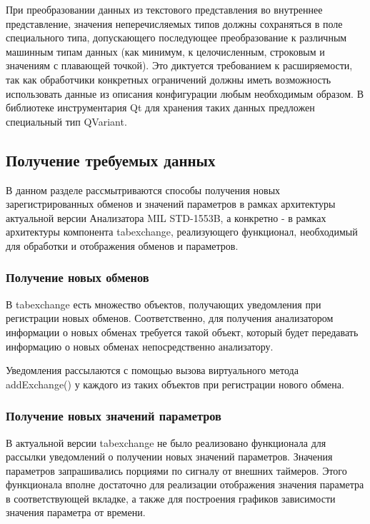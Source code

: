 При преобразовании данных из текстового представления во внутреннее 
представление, значения неперечисляемых типов должны сохраняться в поле 
специального типа, допускающего последующее преобразование к различным машинным 
типам данных (как минимум, к целочисленным, строковым и значениям с плавающей 
точкой). Это диктуется требованием к расширяемости, так как обработчики 
конкретных ограничений должны иметь возможность использовать данные из описания 
конфигурации любым необходимым образом. В библиотеке инструментария Qt для 
хранения таких данных предложен специальный тип QVariant.

\subsection{Получение требуемых данных}

В данном разделе рассмытриваются способы получения новых 
зарегистрированных обменов и значений параметров в рамках архитектуры 
актуальной версии Анализатора MIL STD-1553B, а конкретно - в рамках архитектуры 
компонента tabexchange, реализующего функционал, необходимый для обработки и 
отображения обменов и параметров.

\subsubsection{Получение новых обменов}

В tabexchange есть множество объектов, получающих уведомления при 
регистрации новых обменов. Соответственно, для получения анализатором 
информации о новых обменах требуется такой объект, который будет 
передавать информацию о новых обменах непосредственно анализатору.

Уведомления рассылаются с помощью вызова виртуального метода addExchange() у 
каждого из таких объектов при регистрации нового обмена.

\subsubsection{Получение новых значений параметров}

В актуальной версии tabexchange не было реализовано функционала для рассылки 
уведомлений о получении новых значений параметров. Значения параметров 
запрашивались порциями по сигналу от внешних таймеров. Этого функционала вполне 
достаточно для реализации отображения значения параметра в соответствующей 
вкладке, а также для построения графиков зависимости значения параметра от 
времени. 

